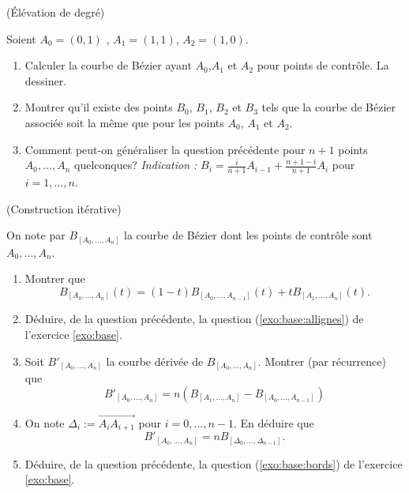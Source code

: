 \documentclass[a4paper,12pt,reqno]{amsart}
\begin{document}
\begin{exo}\label{exo:elev} (Élévation de degré)

   Soient $A_{0}=(0,1)$ , $A_{1}=(1,1)$, $A_{2}=(1,0)$.
   \begin{enumerate}
     \item Calculer la courbe de Bézier ayant $A_{0}$,$ A_{1}$ et $A_{2}$ pour points de contrôle. La dessiner.

     \item Montrer qu'il existe des points $B_{0}$, $B_{1}$, $B_{2}$ et $B_{3}$ tels que la courbe de Bézier associée soit la même que pour les points $A_{0}$, $ A_{1}$ et $A_{2}$.

     \item\label{exo:elev:gen} Comment peut-on généraliser la question précédente pour $n+1$ points $A_{0},\ldots,A_{n}$ quelconques?
     \textit{Indication :} $B_{i} = \frac{i}{n+1}A_{i-1}+\frac{n+1-i}{n+1}A_{i}$ pour $i=1,...,n$.
   \end{enumerate}

\end{exo}

\begin{exo} (Construction itérative)

  On note par $B_{[A_{0},\ldots,A_{n}]}$ la courbe de Bézier dont les points de contrôle sont $A_{0},\ldots,A_{n}$.
  \begin{enumerate}
    \item Montrer que
    $$
      B_{[A_{0},\ldots,A_{n}]}(t) = (1-t)B_{[A_{0},\ldots,A_{n-1}]}(t) +tB_{[A_{1},\ldots,A_{n}]}(t).
    $$

    \item Déduire, de la question précédente, la question (\ref{exo:base:allignes}) de l'exercice \ref{exo:base}.

    \item Soit $B'_{[A_{0},\ldots,A_{n}]}$ la courbe dérivée de $B_{[A_{0},\ldots,A_{n}]}$. Montrer (par récurrence) que
    $$
      B'_{[A_{0},\ldots,A_{n}]} = n\left(B_{[A_{1},\ldots,A_{n}]} - B_{[A_{0},\ldots,A_{n-1}]}\right)
    $$

    \item On note $\Delta_{i} := \overrightarrow{A_{i}A_{i+1}}$ pour $i=0,\ldots,n-1$. En déduire que
    $$
      B'_{[A_{0},\ldots,A_{n}]} = nB_{[\Delta_{0},\ldots,\Delta_{n-1}]}.
    $$

    \item Déduire, de la question précédente, la question (\ref{exo:base:bords}) de l'exercice \ref{exo:base}.
  \end{enumerate}
\end{exo}
\end{document}
